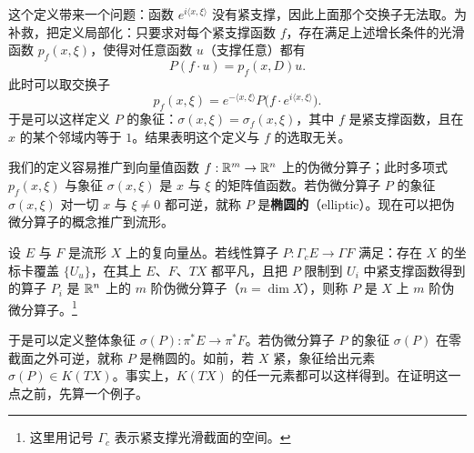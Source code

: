 
这个定义带来一个问题：函数 $e^{i\langle x,\xi\rangle}$ 没有紧支撑，因此上面那个交换子无法取。为补救，把定义局部化：只要求对每个紧支撑函数 $f$，存在满足上述增长条件的光滑函数 $p_f(x,\xi)$，使得对任意函数 $u$（支撑任意）都有
\[
P(f\cdot u)=p_f(x,D)u.
\]
此时可以取交换子
\[
p_f(x,\xi)=e^{-\langle x,\xi\rangle}P\big(f\cdot e^{i\langle x,\xi\rangle}\big).
\]
于是可以这样定义 $P$ 的象征：$\sigma(x,\xi)=\sigma_f(x,\xi)$，其中 $f$ 是紧支撑函数，且在 $x$ 的某个邻域内等于 $1$。结果表明这个定义与 $f$ 的选取无关。

我们的定义容易推广到向量值函数 $f:\mathbb{R}^m\to\mathbb{R}^n$ 上的伪微分算子；此时多项式 $p_f(x,\xi)$ 与象征 $\sigma(x,\xi)$ 是 $x$ 与 $\xi$ 的矩阵值函数。若伪微分算子 $P$ 的象征 $\sigma(x,\xi)$ 对一切 $x$ 与 $\xi\neq0$ 都可逆，就称 $P$ 是\textbf{椭圆的}（elliptic）。现在可以把伪微分算子的概念推广到流形。

\begin{definition}
设 $E$ 与 $F$ 是流形 $X$ 上的复向量丛。若线性算子 $P:\Gamma_cE\to\Gamma F$ 满足：存在 $X$ 的坐标卡覆盖 $\{U_u\}$，在其上 $E$、$F$、$TX$ 都平凡，且把 $P$ 限制到 $U_i$ 中紧支撑函数得到的算子 $P_i$ 是 $\mathbb{R}^n$ 上的 $m$ 阶伪微分算子（$n=\dim X$），则称 $P$ 是 $X$ 上 $m$ 阶伪微分算子。\footnote{这里用记号 $\Gamma_c$ 表示紧支撑光滑截面的空间。}
\end{definition}

于是可以定义整体象征 $\sigma(P):\pi^*E\to\pi^*F$。若伪微分算子 $P$ 的象征 $\sigma(P)$ 在零截面之外可逆，就称 $P$ 是椭圆的。如前，若 $X$ 紧，象征给出元素 $\sigma(P)\in K(TX)$。事实上，$K(TX)$ 的任一元素都可以这样得到。在证明这一点之前，先算一个例子。

